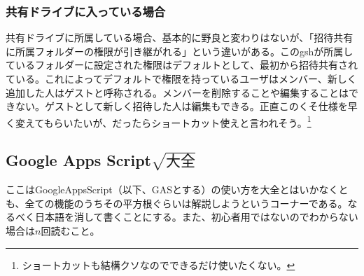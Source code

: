 \documentclass[dvipdfmx,jb5]{jarticle}
\begin{document}
 \subsubsection{共有ドライブに入っている場合}
 共有ドライブに所属している場合、基本的に野良と変わりはないが、「招待共有に所属フォルダーの権限が引き継がれる」という違いがある。このgshが所属しているフォルダーに設定された権限はデフォルトとして、最初から招待共有されている。これによってデフォルトで権限を持っているユーザはメンバー、新しく追加した人はゲストと呼称される。メンバーを削除することや編集することはできない。ゲストとして新しく招待した人は編集もできる。正直このくそ仕様を早く変えてもらいたいが、だったらショートカット使えと言われそう。\footnote{ショートカットも結構クソなのでできるだけ使いたくない。}
  
    \subsection{Google Apps Script$\sqrt{大全}$}
  ここはGoogleAppsScript（以下、GASとする）の使い方を大全とはいかなくとも、全ての機能のうちその平方根ぐらいは解説しようというコーナーである。なるべく日本語を消して書くことにする。また、初心者用ではないのでわからない場合は$n$回読むこと。
  
  
\end{document}
